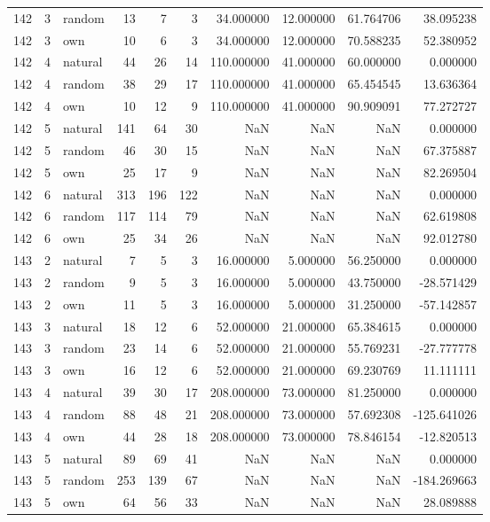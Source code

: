 \begin{table}[htbp]
\begin{tabular}{rrlrrrrrrr}
142 & 3 & random & 13 & 7 & 3 & 34.000000 & 12.000000 & 61.764706 & 38.095238 \\
142 & 3 & own & 10 & 6 & 3 & 34.000000 & 12.000000 & 70.588235 & 52.380952 \\
142 & 4 & natural & 44 & 26 & 14 & 110.000000 & 41.000000 & 60.000000 & 0.000000 \\
142 & 4 & random & 38 & 29 & 17 & 110.000000 & 41.000000 & 65.454545 & 13.636364 \\
142 & 4 & own & 10 & 12 & 9 & 110.000000 & 41.000000 & 90.909091 & 77.272727 \\
142 & 5 & natural & 141 & 64 & 30 & NaN & NaN & NaN & 0.000000 \\
142 & 5 & random & 46 & 30 & 15 & NaN & NaN & NaN & 67.375887 \\
142 & 5 & own & 25 & 17 & 9 & NaN & NaN & NaN & 82.269504 \\
142 & 6 & natural & 313 & 196 & 122 & NaN & NaN & NaN & 0.000000 \\
142 & 6 & random & 117 & 114 & 79 & NaN & NaN & NaN & 62.619808 \\
142 & 6 & own & 25 & 34 & 26 & NaN & NaN & NaN & 92.012780 \\
143 & 2 & natural & 7 & 5 & 3 & 16.000000 & 5.000000 & 56.250000 & 0.000000 \\
143 & 2 & random & 9 & 5 & 3 & 16.000000 & 5.000000 & 43.750000 & -28.571429 \\
143 & 2 & own & 11 & 5 & 3 & 16.000000 & 5.000000 & 31.250000 & -57.142857 \\
143 & 3 & natural & 18 & 12 & 6 & 52.000000 & 21.000000 & 65.384615 & 0.000000 \\
143 & 3 & random & 23 & 14 & 6 & 52.000000 & 21.000000 & 55.769231 & -27.777778 \\
143 & 3 & own & 16 & 12 & 6 & 52.000000 & 21.000000 & 69.230769 & 11.111111 \\
143 & 4 & natural & 39 & 30 & 17 & 208.000000 & 73.000000 & 81.250000 & 0.000000 \\
143 & 4 & random & 88 & 48 & 21 & 208.000000 & 73.000000 & 57.692308 & -125.641026 \\
143 & 4 & own & 44 & 28 & 18 & 208.000000 & 73.000000 & 78.846154 & -12.820513 \\
143 & 5 & natural & 89 & 69 & 41 & NaN & NaN & NaN & 0.000000 \\
143 & 5 & random & 253 & 139 & 67 & NaN & NaN & NaN & -184.269663 \\
143 & 5 & own & 64 & 56 & 33 & NaN & NaN & NaN & 28.089888 \\

\end{tabular}
\end{table}
